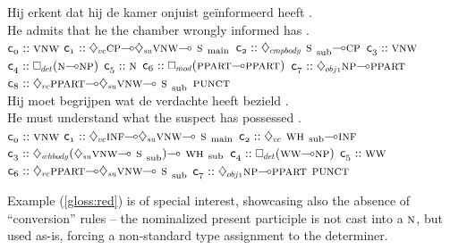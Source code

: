 \begin{exe}
 \label{gloss:green}
\glll Hij erkent dat hij de kamer onjuist ge\"informeerd heeft .\\
He admits that he the chamber wrongly informed has .\\
	$\con{0}::\vnw[s]$
	$\con{1}::\ddia{vc}\cp[s]\li\ddia{su}\vnw[s]\li\smain[s]$
	$\con{2}::\ddia{cmpbody}\ssub[s]\li\cp[s]$
	$\con{3}::\vnw[s]$
	$\con{4}::\dbox{det}(\n[s]\li\np[s])$
	$\con{5}::\n[s]$
	$\con{6}::\dbox{mod}(\ppart[s]\li\ppart[s])$
	$\con{7}::\ddia{obj1}\np[s]\li\ppart[s]$
	$\con{8}::\ddia{vc}\ppart[s]\li\ddia{su}\vnw[s]\li\ssub[s]$
	$\punct[s]$\\
 \label{gloss:red}
\glll Hij moet begrijpen wat de verdachte heeft bezield .\\
He must understand what the suspect has possessed .\\
	$\con{0}::\vnw[s]$
	$\con{1}::\ddia{vc}\infp[s]\li\ddia{su}\vnw[s]\li\smain[s]$
	$\con{2}::\ddia{vc}\whsub[s]\li\infp[s]$
	$\con{3}::\ddia{whbody}(\ddia{su}\vnw[s]\li\ssub[s])\li\whsub[s]$
	$\con{4}::\dbox{det}(\ww[s]\li\np[s])$
	$\con{5}::\ww[s]$
	$\con{6}::\ddia{vc}\ppart[s]\li\ddia{su}\vnw[s]\li\ssub[s]$
	$\con{7}::\ddia{obj1}\np[s]\li\ppart[s]$
	$\punct[s]$\\
\end{exe}
Example (\ref{gloss:red}) is of special interest, showcasing also the absence of ``conversion'' rules --  the nominalized present participle  is not cast into a $\n[s]$, but used as-is, forcing a non-standard type assignment to the determiner.

